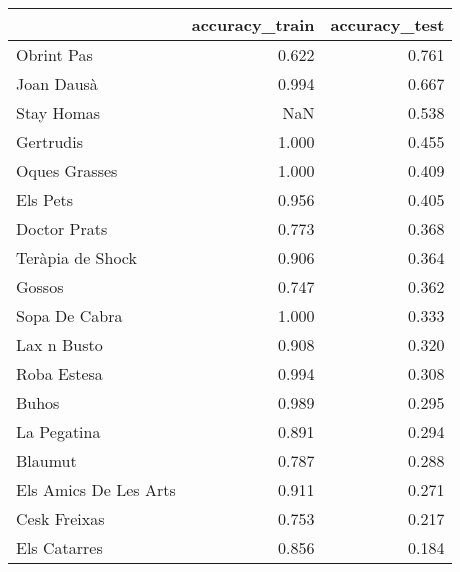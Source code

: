 \begin{tabular}{lrr}
\toprule
{} &  accuracy\_train &  accuracy\_test \\
\midrule
Obrint Pas            &           0.622 &          0.761 \\
Joan Dausà            &           0.994 &          0.667 \\
Stay Homas            &             NaN &          0.538 \\
Gertrudis             &           1.000 &          0.455 \\
Oques Grasses         &           1.000 &          0.409 \\
Els Pets              &           0.956 &          0.405 \\
Doctor Prats          &           0.773 &          0.368 \\
Teràpia de Shock      &           0.906 &          0.364 \\
Gossos                &           0.747 &          0.362 \\
Sopa De Cabra         &           1.000 &          0.333 \\
Lax n Busto           &           0.908 &          0.320 \\
Roba Estesa           &           0.994 &          0.308 \\
Buhos                 &           0.989 &          0.295 \\
La Pegatina           &           0.891 &          0.294 \\
Blaumut               &           0.787 &          0.288 \\
Els Amics De Les Arts &           0.911 &          0.271 \\
Cesk Freixas          &           0.753 &          0.217 \\
Els Catarres          &           0.856 &          0.184 \\
\bottomrule
\end{tabular}
